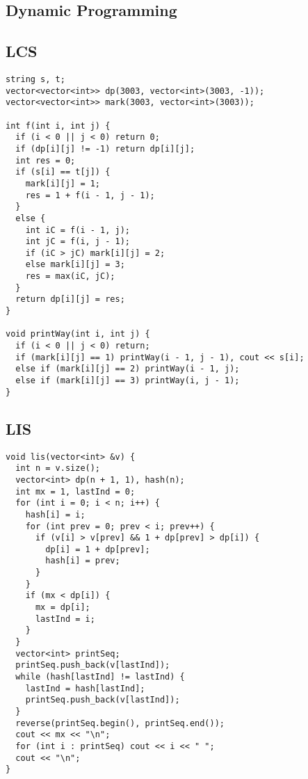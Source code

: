 \documentclass[10pt, a4paper]{article}
\begin{document}
\begin{multicols}{2}
\section{Dynamic Programming}
\subsection{LCS}
\begin{lstlisting}
string s, t;
vector<vector<int>> dp(3003, vector<int>(3003, -1));
vector<vector<int>> mark(3003, vector<int>(3003));

int f(int i, int j) {
  if (i < 0 || j < 0) return 0;
  if (dp[i][j] != -1) return dp[i][j];
  int res = 0;
  if (s[i] == t[j]) {
    mark[i][j] = 1;
    res = 1 + f(i - 1, j - 1);
  }
  else {
    int iC = f(i - 1, j);
    int jC = f(i, j - 1);
    if (iC > jC) mark[i][j] = 2;
    else mark[i][j] = 3;
    res = max(iC, jC);
  }
  return dp[i][j] = res;
}

void printWay(int i, int j) {
  if (i < 0 || j < 0) return;
  if (mark[i][j] == 1) printWay(i - 1, j - 1), cout << s[i];
  else if (mark[i][j] == 2) printWay(i - 1, j);
  else if (mark[i][j] == 3) printWay(i, j - 1);
}
\end{lstlisting}

\subsection{LIS}
\begin{lstlisting}
void lis(vector<int> &v) {
  int n = v.size();
  vector<int> dp(n + 1, 1), hash(n);
  int mx = 1, lastInd = 0;
  for (int i = 0; i < n; i++) {
    hash[i] = i;
    for (int prev = 0; prev < i; prev++) {
      if (v[i] > v[prev] && 1 + dp[prev] > dp[i]) {
        dp[i] = 1 + dp[prev];
        hash[i] = prev;
      }
    }
    if (mx < dp[i]) {
      mx = dp[i];
      lastInd = i;
    }
  }
  vector<int> printSeq;
  printSeq.push_back(v[lastInd]);
  while (hash[lastInd] != lastInd) {
    lastInd = hash[lastInd];
    printSeq.push_back(v[lastInd]);
  }
  reverse(printSeq.begin(), printSeq.end());
  cout << mx << "\n";
  for (int i : printSeq) cout << i << " ";
  cout << "\n";
}

\end{lstlisting}
\end{multicols}
\end{document}
